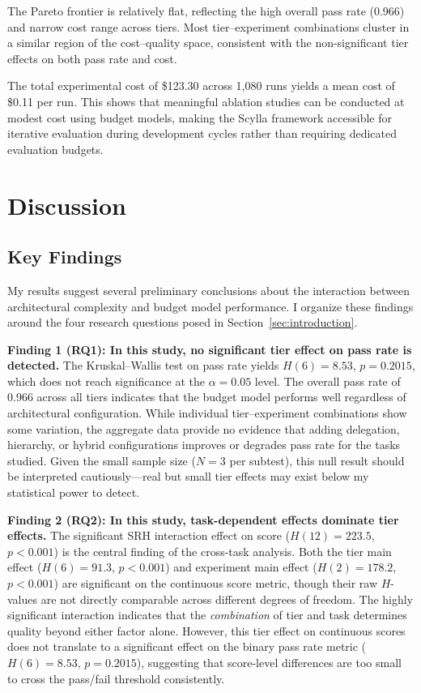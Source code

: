 \documentclass[11pt]{article}
\begin{document}
The Pareto frontier is relatively flat, reflecting the high overall pass rate
(0.966) and narrow cost range across tiers. Most tier--experiment combinations
cluster in a similar region of the cost--quality space, consistent with the
non-significant tier effects on both pass rate and cost.

The total experimental cost of \$123.30 across 1,080 runs yields a mean cost
of \$0.11 per run. This shows that meaningful ablation studies can be
conducted at modest cost using budget models, making the Scylla framework
accessible for iterative evaluation during development cycles rather than
requiring dedicated evaluation budgets.

\section{Discussion}
\label{sec:discussion}

\subsection{Key Findings}
\label{sec:key_findings}

My results suggest several preliminary conclusions about the interaction
between architectural complexity and budget model performance. I organize
these findings around the four research questions posed in
Section~\ref{sec:introduction}.

\textbf{Finding 1 (RQ1): In this study, no significant tier effect on pass rate is detected.}
The Kruskal--Wallis test on pass rate yields $H(6)=8.53$, $p=0.2015$, which
does not reach significance at the $\alpha=0.05$ level. The overall pass rate
of 0.966 across all tiers indicates that the budget model performs well
regardless of architectural configuration. While individual tier--experiment
combinations show some variation, the aggregate data provide no evidence that
adding delegation, hierarchy, or hybrid configurations improves or degrades
pass rate for the tasks studied. Given the small sample size ($N=3$ per
subtest), this null result should be interpreted cautiously---real but small
tier effects may exist below my statistical power to detect.

\textbf{Finding 2 (RQ2): In this study, task-dependent effects dominate tier effects.}
The significant SRH interaction effect on score ($H(12) = 223.5$, $p < 0.001$)
is the central finding of the cross-task analysis. Both the tier main effect
($H(6) = 91.3$, $p < 0.001$) and experiment main effect ($H(2) = 178.2$,
$p < 0.001$) are significant on the continuous score metric, though their raw
$H$-values are not directly comparable across different degrees of freedom.
The highly significant interaction indicates that the \emph{combination} of
tier and task determines quality beyond either factor alone. However, this
tier effect on continuous scores does not translate to a significant effect on
the binary pass rate metric ($H(6)=8.53$, $p=0.2015$), suggesting that
score-level differences are too small to cross the pass/fail threshold
consistently.
\end{document}
